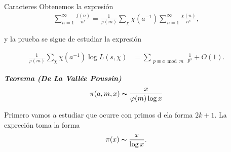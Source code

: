 \documentclass[final]{beamer}
\newlength{\sepwidth}
\newlength{\colwidth}
\newcommand{\separatorcolumn}{\begin{column}{\sepwidth}\end{column}}
\newcommand{\defi}[1]{\textbf{\emph{#1}}}
\begin{document}
\begin{frame}[t,fragile]
\begin{columns}[t]
\begin{column}{\colwidth}
\begin{block}{Caracteres}
Obtenemos la expresión
    \begin{align*}
    \sum_{n=1}^{\infty}\frac{f(n)}{n^s}=\frac{1}{\varphi(m)}\sum_{\chi}\chi(a^{-1})\sum_{n=1}^{\infty}\frac{\chi(n)}{n^s}
,\end{align*}

y la prueba se sigue de estudiar la expresión

\begin{align*}
    \frac{1}{\varphi(m)} \sum_{\chi} \chi(a^{-1}) \log L(s, \chi)
&=\sum_{\substack{p \equiv a\bmod{m}}} \frac{1}{p^s} + O(1)
.\end{align*}
\begin{exampleblock}
    {}\defi{Teorema (De La Vallée Poussin) }$$\pi(a,m,x)\thicksim \dfrac{x}{\varphi(m)\log x}$$
\end{exampleblock}
Primero vamos a estudiar que ocurre con primos d ela forma $2k+1$. La expreción toma la forma
$$\pi(x)\thicksim \dfrac{x}{\log x}.$$
\end{block}
\end{column}

\separatorcolumn


\end{columns}
\end{frame}
\end{document}
